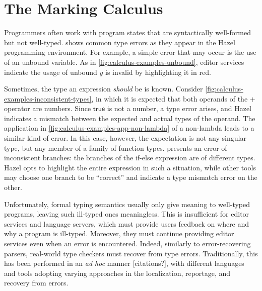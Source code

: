 
\section{The Marking Calculus}
\label{sec:calculus}

Programmers often work with program states that are syntactically well-formed but not well-typed.
 shows common type errors as they appear in the Hazel programming
environment. For example, a simple error that may occur is the use of an unbound variable. As in
\cref{fig:calculus-examples-unbound}, editor services indicate the usage of unbound $y$ is invalid
by highlighting it in red.



Sometimes, the type an expression \emph{should} be is known. Consider
\cref{fig:calculus-examples-inconsistent-types}, in which it is expected that both operands of the
$+$ operator are numbers. Since $\textsf{true}$ is not a number, a type error arises, and Hazel
indicates a mismatch between the expected and actual types of the operand. The application in
\cref{fig:calculus-examples-app-non-lambda} of a non-lambda leads to a similar kind of error. In
this case, however, the expectation is not any singular type, but any member of a family of function
types.  presents an error of inconsistent
branches: the branches of the if-else expression are of different types. Hazel opts to highlight the
entire expression in such a situation, while other tools may choose one branch to be ``correct'' and
indicate a type mismatch error on the other.


Unfortunately, formal typing semantics usually only give meaning to well-typed programs, leaving
such ill-typed ones meaningless. This is insufficient for editor services and language servers,
which must provide users feedback on where and why a program is ill-typed. Moreover, they must
continue providing editor services even when an error is encountered. Indeed, similarly to
error-recovering parsers, real-world type checkers must recover from type errors. Traditionally,
this has been performed in an \emph{ad hoc} manner [citations?], with different languages and tools
adopting varying approaches in the localization, reportage, and recovery from errors. 

